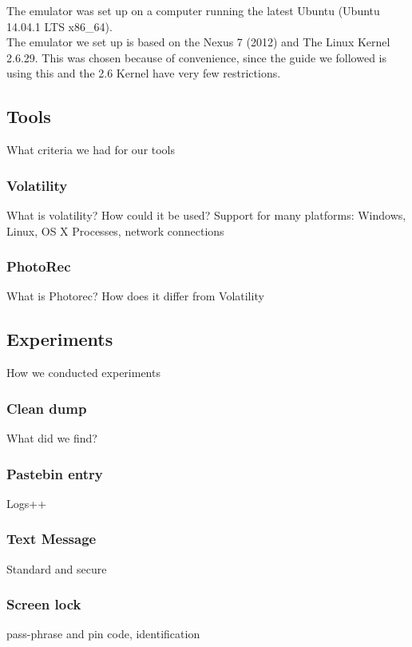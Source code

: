The emulator was set up on a computer running the latest Ubuntu (Ubuntu 14.04.1 LTS x86_64).\\
The emulator we set up is based on the Nexus 7 (2012) and The Linux Kernel 2.6.29. This was chosen because of 
convenience, since the guide we followed is using this and the 2.6 Kernel have very few restrictions.
\subsection{Tools}
What criteria we had for our tools
  \subsubsection{Volatility}
  What is volatility? How could it be used?
  Support for many platforms: Windows, Linux, OS X
  Processes, network connections
  \subsubsection{PhotoRec}
  What is Photorec? How does it differ from Volatility
\subsection{Experiments}
How we conducted experiments
  \subsubsection{Clean dump}
  What did we find?
  \subsubsection{Pastebin entry}
  Logs++
  \subsubsection{Text Message}
  Standard and secure
  \subsubsection{Screen lock}
  pass-phrase and pin code, identification
